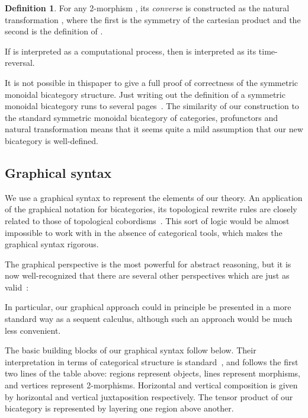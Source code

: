 \documentclass[a4paper,12pt]{article}
\newtheorem{lemma}[theorem]{Lemma}
\theoremstyle{definition}
\newtheorem{defn}[theorem]{Definition}
\newcommand\ignore[1]{}
\renewcommand{\-}[0]{\nobreakdash-\hspace{0pt}}
\begin{document}
\begin{defn}
For any 2-morphism , its \textit{converse}  is constructed as the natural transformation \mbox{}, where the first is the symmetry of the cartesian product and the second is the definition of .
\end{defn}

\noindent
If  is interpreted as a computational process, then  is interpreted as its time-reversal.

It is not possible in this{}paper to give a full proof of correctness of the symmetric monoidal bicategory structure. Just writing out the definition of a symmetric monoidal bicategory runs to several pages~\cite[Section 2.2]{sp11-thesis}. The similarity of our construction to the standard symmetric monoidal bicategory of categories, profunctors and natural transformation means that it seems quite a mild assumption that our new bicategory is well-defined.

\ignore{
We do check one detail here, to give a sense of the necessary proof style.
\begin{lemma}
Horizontal composition of 2\-cells in  is well-defined.
\end{lemma}
\begin{proof}
LET'S SEE IF WE HAVE SPACE FOR THIS.
\end{proof}
}

\subsection{Graphical syntax}
\label{sec:syntax}

\noindent
We use a graphical syntax to represent the elements of our theory. An application of the graphical notation for bicategories, its topological rewrite rules are closely related to those of topological cobordisms~\cite{sp11-thesis}. This sort of logic would be almost impossible to work with in the absence of categorical tools, which makes the graphical syntax rigorous.

The graphical perspective is the most powerful for abstract reasoning, but it is now well-recognized that there are several other perspectives which are just as valid~\cite{bs10-rosetta, s11-sgl}:

In particular, our graphical approach could in principle be presented in a more standard way as a sequent calculus, although such an approach would be much less convenient.

The basic building blocks of our graphical syntax follow below. Their interpretation in terms of categorical structure is standard~\citep[Section~2.2]{l06-faaa}, and follows the first two lines of the table above: regions represent objects, lines represent morphisms, and vertices represent 2\-morphisms. Horizontal and vertical composition is given by horizontal and vertical juxtaposition respectively. The tensor product of our bicategory is represented by layering one region above another.
\end{document}

